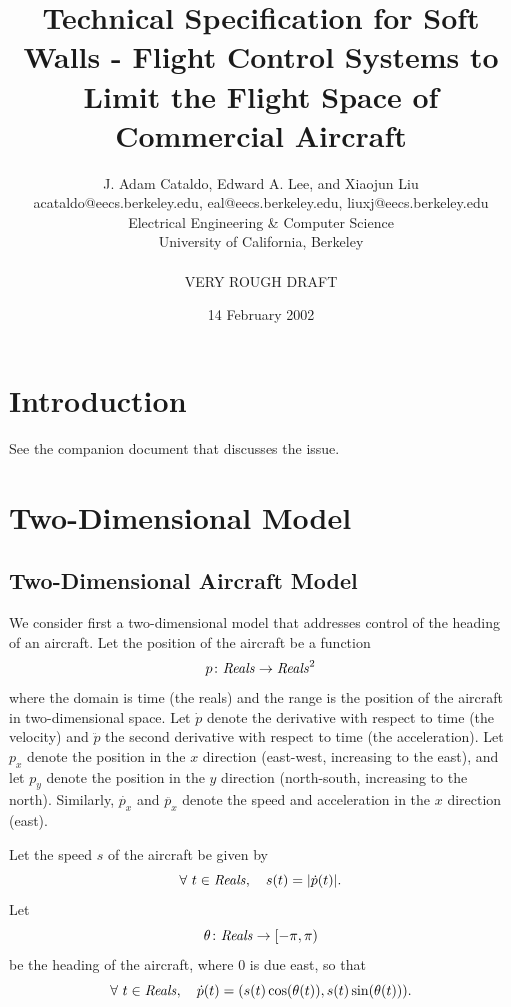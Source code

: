 \documentclass[11pt]{article}
\begin{document}


\title{Technical Specification for Soft Walls -
Flight Control Systems to Limit the Flight Space of Commercial Aircraft}
\author{J. Adam Cataldo, Edward A. Lee, and Xiaojun Liu\\
acataldo@eecs.berkeley.edu, eal@eecs.berkeley.edu, liuxj@eecs.berkeley.edu\\
Electrical Engineering \& Computer Science\\
University of California, Berkeley\\
\\
VERY ROUGH DRAFT\\}
\date{14 February 2002}

\maketitle

\section{Introduction}

See the companion document that discusses the issue.

\section{Two-Dimensional Model}

\subsection{Two-Dimensional Aircraft Model}

We consider first a two-dimensional model that addresses
control of the heading of an aircraft.
Let the position of the aircraft be a function
\[
p \colon \mbox{\textit{Reals}} \to \mbox{\textit{Reals}} ^2
\]
where the domain is
time (the reals) and the range is the position of the aircraft
in two-dimensional space.
Let $\dot{p}$ denote the derivative with respect to time (the
velocity) and $\ddot{p}$ the second derivative with respect to time (the
acceleration). Let $p_x$ denote the position in the $x$ direction (east-west,
increasing to the east), and let $p_y$ denote the position in the $y$ direction
(north-south, increasing to the north). Similarly, $\dot{p_x}$ and $\ddot{p_x}$
denote the speed and acceleration in the $x$ direction (east).

Let the speed $s$ of the aircraft be given by
\[
\forall ~ t \in \mbox{\textit{Reals}}, \quad
s(t) = |\dot{p}(t)| .
\]
Let
\[
\theta \colon \mbox{\textit{Reals}} \to [-\pi, \pi)
\]
be the heading of the aircraft, where 0 is due east, so that
\[
\forall ~ t \in \mbox{\textit{Reals}}, \quad
\dot{p} (t) = (s(t) \cos(\theta (t)), s(t) \sin(\theta(t))) .
\]
\end{document}
